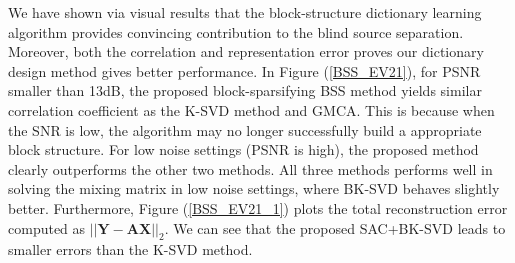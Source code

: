 We have shown via visual results that the block-structure dictionary learning algorithm provides convincing contribution to the blind source separation. Moreover, both the correlation and representation error proves our dictionary design method gives better performance. In Figure (\ref{BSS_EV21}), for PSNR smaller than 13dB, the proposed block-sparsifying BSS method yields similar correlation coefficient as the K-SVD method and GMCA. This is because when the SNR is low, the algorithm may no longer successfully build a appropriate block structure. For low noise settings (PSNR is high), the proposed method clearly outperforms the other two methods. All three methods performs well in solving the mixing matrix in low noise settings, where BK-SVD behaves slightly better. Furthermore, Figure (\ref{BSS_EV21_1}) plots the total reconstruction error computed as $||\mathbf{Y} - \mathbf{AX}||_2$. We can see that the proposed SAC+BK-SVD leads to smaller errors than the K-SVD method.\\


